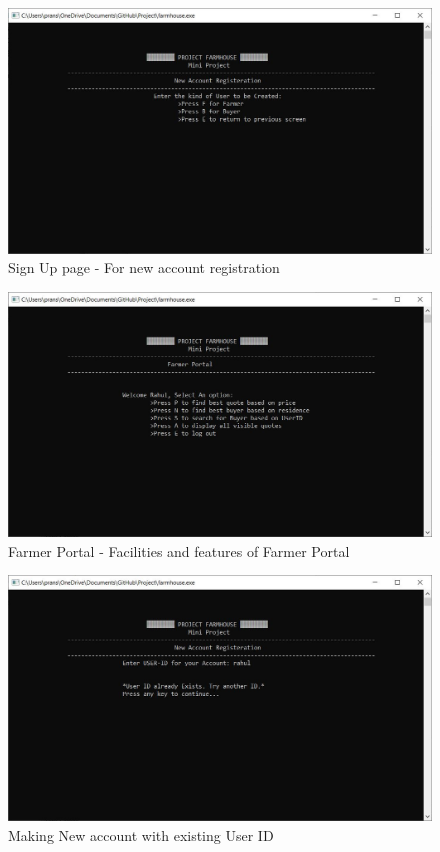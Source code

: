 \documentclass[12pt]{article}
\begin{document}
\begin{figure}[h!]
    \centering
    \includegraphics[width = \columnwidth]{ScreenShots/Sign_Up.JPG}
    \caption{Sign Up page - For new account registration }
\end{figure}


\begin{figure}[h!]
    \centering
    \includegraphics[width = \columnwidth]{ScreenShots/Farmer_3.JPG}
    \caption{Farmer Portal - Facilities and features of Farmer Portal }
\end{figure}

\begin{figure}[h!]
    \centering
    \includegraphics[width = \columnwidth]{ScreenShots/Sign_Up2.JPG}
    \caption{Making New account with existing User ID }
\end{figure}
\end{document}

